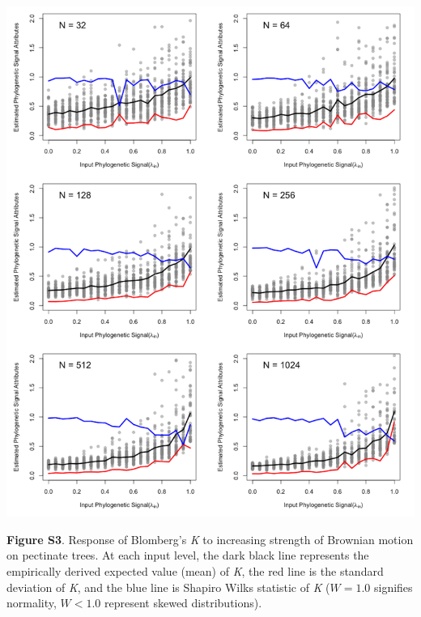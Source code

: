\documentclass[
]{article}
\begin{document}
\includegraphics[width=0.95\linewidth]{fig.S3}

\textbf{Figure S3}. Response of Blomberg's \textit{K} to increasing
strength of Brownian motion on pectinate trees. At each input level, the
dark black line represents the empirically derived expected value (mean)
of \textit{K}, the red line is the standard deviation of \textit{K}, and
the blue line is Shapiro Wilks statistic of \textit{K} (\(W=1.0\)
signifies normality, \(W< 1.0\) represent skewed distributions).
\end{document}
